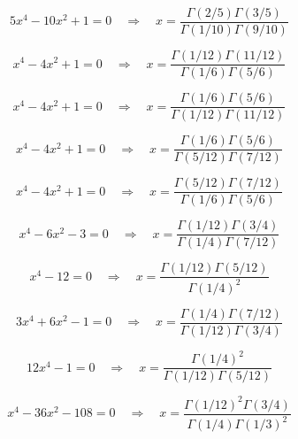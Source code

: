 \documentclass[11pt,a4paper]{article}
\begin{document}
\begin{equation}\label{eq:87}
5x^{4} - 10x^{2} + 1 = 0 \quad \Rightarrow \quad x = \frac{\Gamma(2/5)\Gamma(3/5)}{\Gamma(1/10)\Gamma(9/10)}
\end{equation}

\begin{equation}\label{eq:88}
x^{4} - 4x^{2} + 1 = 0 \quad \Rightarrow \quad x = \frac{\Gamma(1/12)\Gamma(11/12)}{\Gamma(1/6)\Gamma(5/6)}
\end{equation}

\begin{equation}\label{eq:89}
x^{4} - 4x^{2} + 1 = 0 \quad \Rightarrow \quad x = \frac{\Gamma(1/6)\Gamma(5/6)}{\Gamma(1/12)\Gamma(11/12)}
\end{equation}

\begin{equation}\label{eq:90}
x^{4} - 4x^{2} + 1 = 0 \quad \Rightarrow \quad x = \frac{\Gamma(1/6)\Gamma(5/6)}{\Gamma(5/12)\Gamma(7/12)}
\end{equation}

\begin{equation}\label{eq:91}
x^{4} - 4x^{2} + 1 = 0 \quad \Rightarrow \quad x = \frac{\Gamma(5/12)\Gamma(7/12)}{\Gamma(1/6)\Gamma(5/6)}
\end{equation}

\begin{equation}\label{eq:92}
x^{4} - 6x^{2} - 3 = 0 \quad \Rightarrow \quad x = \frac{\Gamma(1/12)\Gamma(3/4)}{\Gamma(1/4)\Gamma(7/12)}
\end{equation}

\begin{equation}\label{eq:93}
x^{4} - 12 = 0 \quad \Rightarrow \quad x = \frac{\Gamma(1/12)\Gamma(5/12)}{\Gamma(1/4)^2}
\end{equation}

\begin{equation}\label{eq:94}
3x^{4} + 6x^{2} - 1 = 0 \quad \Rightarrow \quad x = \frac{\Gamma(1/4)\Gamma(7/12)}{\Gamma(1/12)\Gamma(3/4)}
\end{equation}

\begin{equation}\label{eq:95}
12x^{4} - 1 = 0 \quad \Rightarrow \quad x = \frac{\Gamma(1/4)^2}{\Gamma(1/12)\Gamma(5/12)}
\end{equation}

\begin{equation}\label{eq:96}
x^{4} - 36x^{2} - 108 = 0 \quad \Rightarrow \quad x = \frac{\Gamma(1/12)^2\Gamma(3/4)}{\Gamma(1/4)\Gamma(1/3)^2}
\end{equation}
\end{document}
